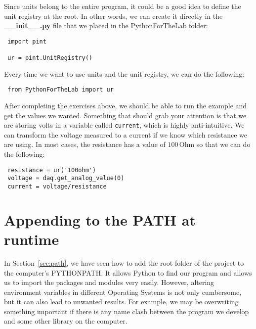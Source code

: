 Since units belong to the entire program, it could be a good idea to define the unit registry at the root. In other words, we can create it directly in the \textbf{\_\_init\_\_.py} file that we placed in the PythonForTheLab folder:

\begin{verbatim}
 import pint

 ur = pint.UnitRegistry()
\end{verbatim}

Every time we want to use units and the unit registry, we can do the following:

\begin{verbatim}
 from PythonForTheLab import ur
\end{verbatim}



After completing the exercises above, we should be able to run the example and get the values we wanted. Something that should grab your attention is that we are storing volts in a variable called \texttt{current}, which is highly anti-intuitive. We can transform the voltage measured to a current if we know which resistance we are using. In most cases, the resistance has a value of $100\,\textrm{Ohm}$ so that we can do the following:

\begin{verbatim}
 resistance = ur('100ohm')
 voltage = daq.get_analog_value(0)
 current = voltage/resistance
\end{verbatim}

\section{Appending to the PATH at runtime}\label{sec:appending-path}
In Section~\ref{sec:path}, we have seen how to add the root folder of the project to the computer's PYTHONPATH. It allows Python to find our program and allows us to import the packages and modules very easily. However, altering environment variables in different Operating Systems is not only cumbersome, but it can also lead to unwanted results. For example, we may be overwriting something important if there is any name clash between the program we develop and some other library on the computer.

